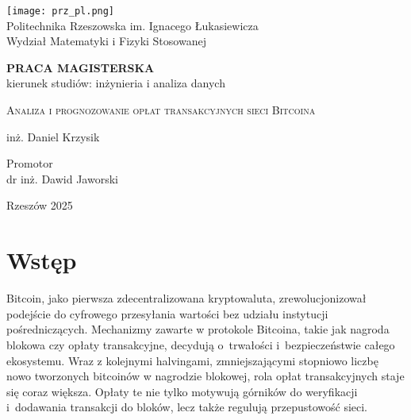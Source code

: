 \documentclass[12pt,a4paper]{report}
\theoremstyle{definition} %
\begin{document}
	
	\thispagestyle{empty}
	\begin{titlepage}
		\def\dystans{1cm}
		\begin{center}
			\Large 
			\texttt{[image: prz\_pl.png]}\\
			Politechnika Rzeszowska 
			im. Ignacego Łukasiewicza\\
			Wydział Matematyki i Fizyki Stosowanej
		\end{center}
		\vspace{1.3cm}
		\begin{center}
			{\Large  \textsc{\textbf{PRACA MAGISTERSKA}} \\
				\vspace{0.5cm}
				\large kierunek studiów: inżynieria i analiza danych }
		\end{center}
		\vspace{1.1cm}
		\begin{center}
			
			{\LARGE\textsc{Analiza i prognozowanie opłat transakcyjnych sieci Bitcoina}}\\
		\end{center}	
		\vspace{1.1cm}
		\begin{center}
			{\Large {inż. Daniel Krzysik}}
		\end{center}
		
		\vspace{1cm} 
		\begin{flushright}		
			\begin{minipage}{0.5\textwidth}
				\begin{flushright}
					\large
					Promotor \\
					dr inż. Dawid Jaworski
				\end{flushright}
			\end{minipage}
		\end{flushright}		
		
		
		\vfill 
		\begin{center}
			{\Large Rzeszów 2025}
		\end{center}
	\end{titlepage}
	
	\setcounter{tocdepth}{1}
	\tableofcontents
	
	\chapter*{Wstęp}
	\hspace*{\parindent}Bitcoin, jako pierwsza zdecentralizowana kryptowaluta, zrewolucjonizował podejście do cyfrowego przesyłania wartości bez udziału instytucji pośredniczących. Mechanizmy zawarte w protokole Bitcoina, takie jak nagroda blokowa czy opłaty transakcyjne, decydują o~trwałości i~bezpieczeństwie całego ekosystemu. Wraz z kolejnymi 		halvingami, zmniejszającymi stopniowo liczbę nowo tworzonych bitcoinów w nagrodzie blokowej, rola opłat transakcyjnych staje się coraz większa. Opłaty te nie tylko motywują górników do weryfikacji i~dodawania transakcji do bloków, lecz także regulują przepustowość sieci.
\end{document}
